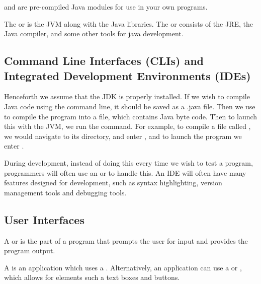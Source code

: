 \documentclass[11pt]{article}
\begin{document}
\begin{figure}[H]
\begin{subfigure}[t]{.5\textwidth}
{
        }
    \end{subfigure}
\end{figure}

\begin{defi}
     and  are pre-compiled Java modules for use in your own programs.
\end{defi}
The  or  is the JVM along with the Java libraries. The  or  consists of the JRE, the Java compiler, and some other tools for java development.
\pagebreak
\subsection{Command Line Interfaces (CLIs) and Integrated Development Environments (IDEs)}
Henceforth we assume that the JDK is properly installed. If we wish to compile Java code using the command line, it should be saved as a .java file. Then we use  to compile the program into a  file, which contains Java byte code. Then to launch this with the JVM, we run the  command. For example, to compile a file called , we would navigate to its directory, and enter , and to launch the program we enter . 

\par During development, instead of doing this every time we wish to test a program, programmers will often use an  or  to handle this. An IDE will often have many features designed for development, such as syntax highlighting, version management tools and debugging tools.

\subsection{User Interfaces}
\begin{defi}
    A  or  is the part of a program that prompts the user for input and provides the program output. 
\end{defi}
 A  is an application which uses a . Alternatively, an application can use a  or , which allows for elements such a text boxes and buttons.
\end{document}
